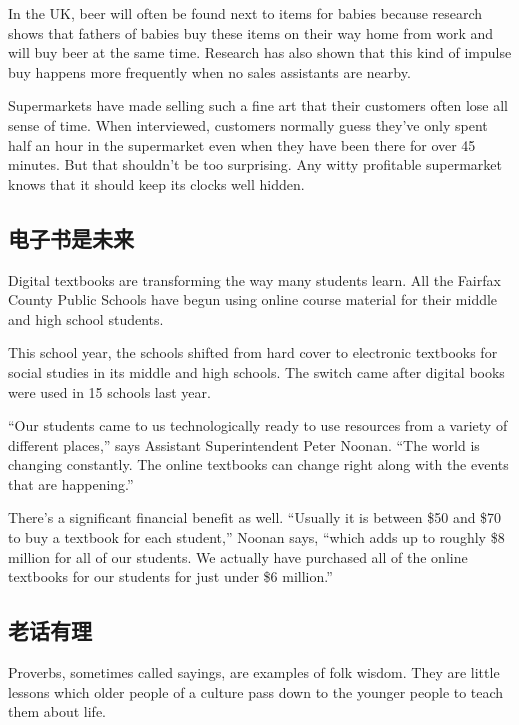 In the UK, beer will often be found next to items for babies
because research shows that fathers of babies buy these
items on their way home from work and will buy beer at
the same time. Research has also shown that this kind of
impulse buy happens more frequently when no sales assistants
are nearby.

Supermarkets have made selling such a fine art that their
customers often lose all sense of time. When interviewed,
customers normally guess they've only spent half an
hour in the supermarket even when they have been there
for over 45 minutes. But that shouldn't be too surprising.
Any witty profitable supermarket knows that it should keep
its clocks well hidden.

\subsection{电子书是未来}
\begin{margintable}\vspace{-2cm}\footnotesize
\end{margintable}
Digital textbooks are transforming the way many students
learn. All the Fairfax County Public Schools have begun using online course
material for their middle and high school students.

This school year, the schools shifted from hard cover
to electronic textbooks for social studies in its middle and
high schools. The switch came after digital books were
used in 15 schools last year.


“Our students came to us technologically ready to use resources
from a variety of different places,” says Assistant
Superintendent Peter Noonan. “The world is changing constantly.
The online textbooks can change right along with
the events that are happening.”

There's a significant financial benefit as well. “Usually it is
between \$50 and \$70 to buy a textbook for each student,”
Noonan says, “which adds up to roughly \$8 million for
all of our students. We actually have purchased all of the
online textbooks for our students for just under \$6 million.”

\subsection{老话有理}
\begin{margintable}\vspace{-2cm}\footnotesize
\end{margintable}
Proverbs, sometimes called sayings, are examples of folk
wisdom. They are little lessons which older people of a
culture pass down to the younger people to teach them
about life.

